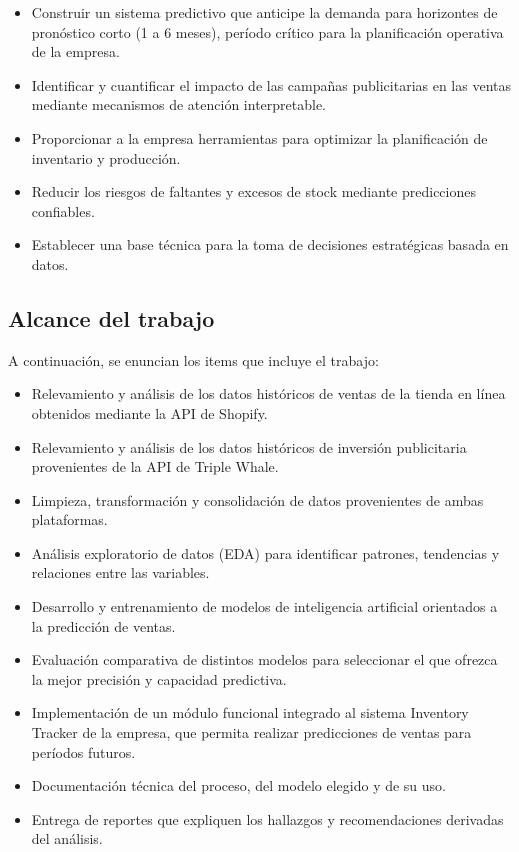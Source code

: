 \begin{itemize}
\item Construir un sistema predictivo que anticipe la demanda para horizontes de pronóstico corto (1 a 6 meses), período crítico para la planificación operativa de la empresa.
\item Identificar y cuantificar el impacto de las campañas publicitarias en las ventas mediante mecanismos de atención interpretable.
\item Proporcionar a la empresa herramientas para optimizar la planificación de inventario y producción.
\item Reducir los riesgos de faltantes y excesos de stock mediante predicciones confiables.
\item Establecer una base técnica para la toma de decisiones estratégicas basada en datos.
\end{itemize}

\subsection{Alcance del trabajo}

A continuación, se enuncian los items que incluye el trabajo:

\begin{itemize}
    \item Relevamiento y análisis de los datos históricos de ventas de la tienda en línea obtenidos mediante la API de Shopify.
    
    \item Relevamiento y análisis de los datos históricos de inversión publicitaria provenientes de la
API de Triple Whale.

    \item Limpieza, transformación y consolidación de datos provenientes de ambas plataformas.
    
     \item Análisis exploratorio de datos (EDA) para identificar patrones, tendencias y relaciones
entre las variables.
     
     \item Desarrollo y entrenamiento de modelos de inteligencia artificial orientados a la predicción
de ventas.
     
     \item Evaluación comparativa de distintos modelos para seleccionar el que ofrezca la mejor
precisión y capacidad predictiva.
     
     \item Implementación de un módulo funcional integrado al sistema Inventory Tracker de la
empresa, que permita realizar predicciones de ventas para períodos futuros.

     
     \item Documentación técnica del proceso, del modelo elegido y de su uso.
     
     \item Entrega de reportes que expliquen los hallazgos y recomendaciones derivadas del análisis.
     
\end{itemize}


